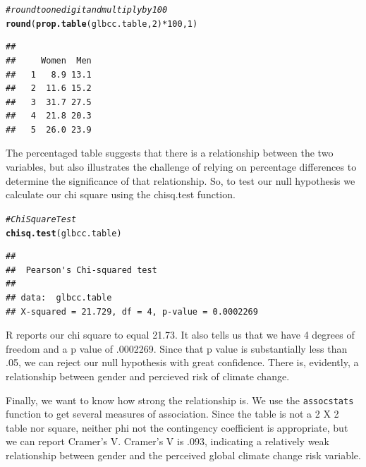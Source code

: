 \documentclass[11pt,openany]{book}\usepackage[]{graphicx}\usepackage[]{color}
\makeatletter
\newcommand{\hlnum}[1]{\textcolor[rgb]{0.686,0.059,0.569}{#1}}%
\newcommand{\hlcom}[1]{\textcolor[rgb]{0.678,0.584,0.686}{\textit{#1}}}%
\newcommand{\hlopt}[1]{\textcolor[rgb]{0,0,0}{#1}}%
\newcommand{\hlstd}[1]{\textcolor[rgb]{0.345,0.345,0.345}{#1}}%
\newcommand{\hlkwd}[1]{\textcolor[rgb]{0.737,0.353,0.396}{\textbf{#1}}}%
\newenvironment{kframe}{%
 \def\at@end@of@kframe{}%
 \ifinner\ifhmode%
  \def\at@end@of@kframe{\end{minipage}}%
  \begin{minipage}{\columnwidth}%
 \fi\fi%
 \def\FrameCommand##1{\hskip\@totalleftmargin \hskip-\fboxsep
 \colorbox{shadecolor}{##1}\hskip-\fboxsep
     \hskip-\linewidth \hskip-\@totalleftmargin \hskip\columnwidth}%
 \MakeFramed {\advance\hsize-\width
   \@totalleftmargin\z@ \linewidth\hsize
   \@setminipage}}%
 {\par\unskip\endMakeFramed%
 \at@end@of@kframe}
\newenvironment{knitrout}{}{} %
\renewenvironment{knitrout}{\begin{singlespace}}{\end{singlespace}} %
\makeatother
\begin{document}
\begin{knitrout}
\color{fgcolor}\begin{kframe}
\begin{alltt}
\hlcom{# round to one digit and multiply by 100}
\hlkwd{round}\hlstd{(}\hlkwd{prop.table}\hlstd{(glbcc.table,} \hlnum{2}\hlstd{)} \hlopt{*} \hlnum{100}\hlstd{,} \hlnum{1}\hlstd{)}
\end{alltt}
\begin{verbatim}
##    
##     Women  Men
##   1   8.9 13.1
##   2  11.6 15.2
##   3  31.7 27.5
##   4  21.8 20.3
##   5  26.0 23.9
\end{verbatim}
\end{kframe}
\end{knitrout}
  
The percentaged table suggests that there is a relationship between the two variables, but also illustrates the challenge of relying on percentage differences to determine the significance of that relationship.  So, to test our null hypothesis we calculate our chi square using the chisq.test function.  

\begin{knitrout}
\color{fgcolor}\begin{kframe}
\begin{alltt}
\hlcom{# Chi Square Test}
\hlkwd{chisq.test}\hlstd{(glbcc.table)}
\end{alltt}
\begin{verbatim}
## 
## 	Pearson's Chi-squared test
## 
## data:  glbcc.table
## X-squared = 21.729, df = 4, p-value = 0.0002269
\end{verbatim}
\end{kframe}
\end{knitrout}

R reports our chi square to equal 21.73.  It also tells us that we have 4 degrees of freedom and a p value of .0002269.  Since that p value is substantially less than .05, we can reject our null hypothesis with great confidence.  There is, evidently, a relationship between gender and percieved risk of climate change.

Finally, we want to know how strong the relationship is.  We use the \texttt{assocstats} function to get several measures of association.   Since the table is not a 2 X 2 table nor square, neither phi not the contingency coefficient is appropriate, but we can report Cramer's V.  Cramer's V is .093, indicating a relatively weak relationship between gender and the perceived global climate change risk variable.
\end{document}
